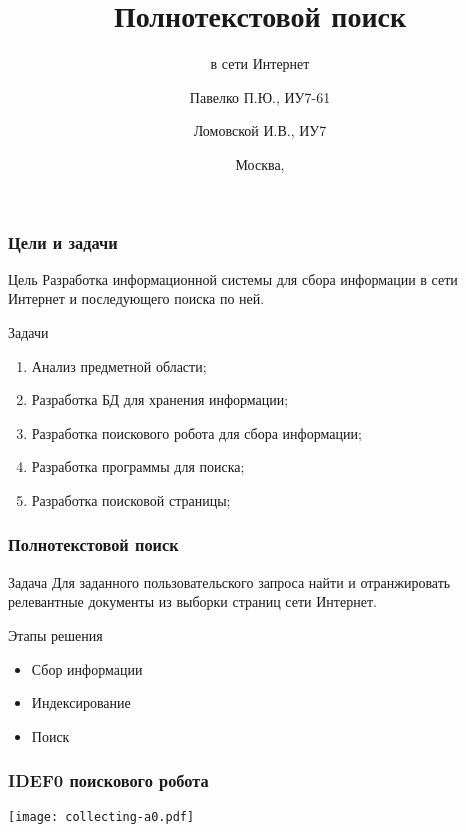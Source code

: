 \documentclass[hyperref={unicode}, 14pt]{beamer}
\title{Полнотекстовой поиск}
\subtitle{в сети Интернет}
\author[Павелко П.Ю.]{Павелко П.Ю., ИУ7-61 \and Ломовской И.В., ИУ7}
\institute[]{МГТУ им. Баумана}
\date{Москва, \the\year}
\begin{document}
\begin{frame}
  \titlepage
\end{frame}

\begin{frame}
  \frametitle{Цели и задачи}

  \begin{block}{Цель}
    Разработка информационной системы для сбора информации в сети Интернет и последующего поиска по ней.
  \end{block}

  \begin{block}{Задачи}
    \begin{enumerate}
      \item Анализ предметной области;
      \item Разработка БД для хранения информации;
      \item Разработка поискового робота для сбора информации;
      \item Разработка программы для поиска;
      \item Разработка поисковой страницы;
    \end{enumerate}
  \end{block}
\end{frame}

\begin{frame}
  \frametitle{Полнотекстовой поиск}

  \begin{block}{Задача}
    Для заданного пользовательского запроса найти и отранжировать релевантные документы из выборки страниц сети Интернет.
  \end{block}

  \begin{block}{Этапы решения}
    \begin{itemize}
      \item Сбор информации
      \item Индексирование
      \item Поиск
    \end{itemize}
  \end{block}
\end{frame}

\begin{frame}
  \frametitle{IDEF0 поискового робота}

  \begin{center}
    \texttt{[image: collecting-a0.pdf]}
  \end{center}
\end{frame}
\end{document}
